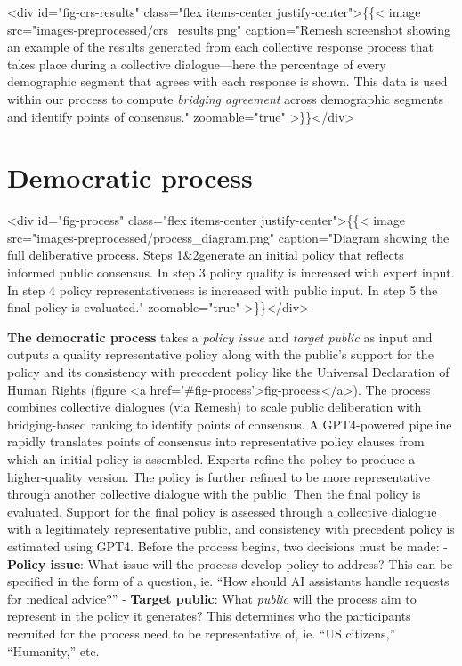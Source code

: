 \documentclass{article}
\begin{document}
<div id="fig-crs-results" class="flex items-center justify-center">\{\{< image src="images-preprocessed/crs_results.png" caption="Remesh screenshot showing an example of the results generated from each collective response process that takes place during a collective dialogue---here the percentage of every demographic segment that agrees with each response is shown. This data is used within our process to compute \emph{bridging agreement} across demographic segments and identify points of consensus." zoomable="true" >\}\}</div>



\section{Democratic process}


<div id="fig-process" class="flex items-center justify-center">\{\{< image src="images-preprocessed/process_diagram.png" caption="Diagram showing the full deliberative process. Steps 1\&2generate an initial policy that reflects informed public consensus. In step 3 policy quality is increased with expert input. In step 4 policy representativeness is increased with public input. In step 5 the final policy is evaluated." zoomable="true" >\}\}</div>



\textbf{The democratic process} takes a \emph{policy issue} and \emph{target public} as input and outputs a quality representative policy along with the public’s support for the policy and its consistency with precedent policy like the Universal Declaration of Human Rights (figure <a href='#fig-process'>fig-process</a>). The process combines collective dialogues (via Remesh) to scale public deliberation with bridging-based ranking to identify points of consensus. A GPT4-powered pipeline rapidly translates points of consensus into representative policy clauses from which an initial policy is assembled. Experts refine the policy to produce a higher-quality version. The policy is further refined to be more representative through another collective dialogue with the public. Then the final policy is evaluated. Support for the final policy is assessed through a collective dialogue with a legitimately representative public, and consistency with precedent policy is estimated using GPT4. Before the process begins, two decisions must be made:
-  \textbf{Policy issue}: What issue will the process develop policy to address? This can be specified in the form of a question, ie. “How should AI assistants handle requests for medical advice?”
-  \textbf{Target public}: What \emph{public} will the process aim to represent in the policy it generates? This determines who the participants recruited for the process need to be representative of, ie. “US citizens,” “Humanity,” etc.
\end{document}
